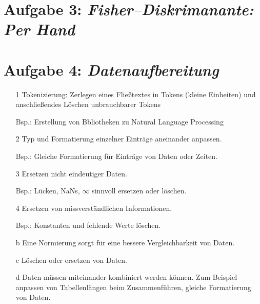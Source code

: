 \section*{Aufgabe 3: \emph{Fisher--Diskrimanante: Per Hand}}

\section*{Aufgabe 4: \emph{Datenaufbereitung}}

\begin{itemize}

\item[1] Tokenizierung: Zerlegen eines Fließtextes in Tokens (kleine Einheiten) und anschließendes Löschen unbrauchbarer Tokens
\item[Bsp.:] Erstellung von Bbliotheken zu Natural Language Processing
\item[2] Typ und Formatierung einzelner Einträge aneinander anpassen.
\item[Bsp.:] Gleiche Formatierung für Einträge von Daten oder Zeiten.
\item[3] Ersetzen nicht eindeutiger Daten.
\item[Bsp.:] Lücken, NaNs, $\infty$ sinnvoll ersetzen oder löschen.
\item[4] Ersetzen von missverständlichen Informationen.
\item[Bsp.:] Konstanten und fehlende Werte löschen.

\item[b] Eine Normierung sorgt für eine bessere Vergleichbarkeit von Daten.
\item[c] Löschen oder ersetzen von Daten.
\item[d] Daten müssen miteinander kombiniert werden können. Zum Beispiel anpassen von Tabellenlängen beim Zusammenführen, gleiche Formatierung von Daten.
\end{itemize}